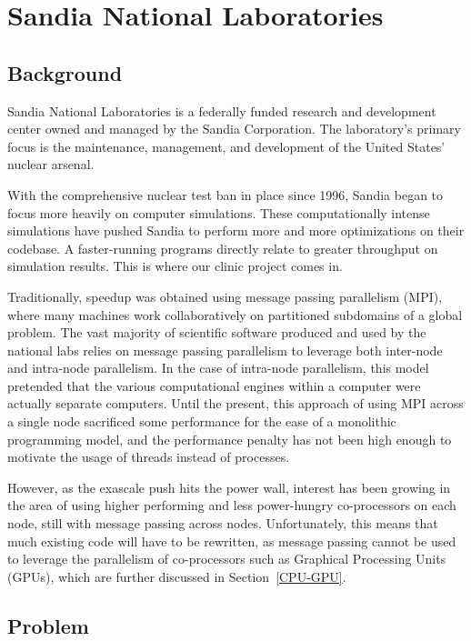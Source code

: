 
\chapter{Sandia National Laboratories}

\section{Background}

Sandia National Laboratories is a federally funded research and development
center owned and managed by the Sandia Corporation.  The laboratory's primary
focus is the maintenance, management, and development of the United States'
nuclear arsenal. 

With the comprehensive nuclear test ban in place since 1996, Sandia began to focus more heavily on
computer simulations. These computationally intense simulations have pushed Sandia
to perform more and more optimizations on their codebase. A faster-running programs
directly relate to greater throughput on simulation results. This is where our clinic project comes in.

Traditionally, speedup was obtained using message passing parallelism (MPI), where many machines
 work collaboratively on partitioned subdomains of a global problem. The vast
majority of scientific software produced and used by the national labs relies on
message passing parallelism to leverage both inter-node and intra-node
parallelism. In the case of intra-node parallelism, this model pretended that the 
various computational engines within a computer were actually separate computers.
Until the present, this approach of using MPI across a single node
sacrificed some performance for the ease of a monolithic programming model, and
the performance penalty has not been high enough to motivate the usage of
threads instead of processes. 

However, as the exascale push hits the power
wall, interest has been growing in the area of using higher performing and less
power-hungry co-processors on each node, still with message passing across
nodes.  Unfortunately, this means that much existing code will have to be rewritten, as
message passing cannot be used to leverage the parallelism of co-processors such
as Graphical Processing Units (GPUs), which are further discussed in Section~\ref{CPU-GPU}.


\section{Problem}

